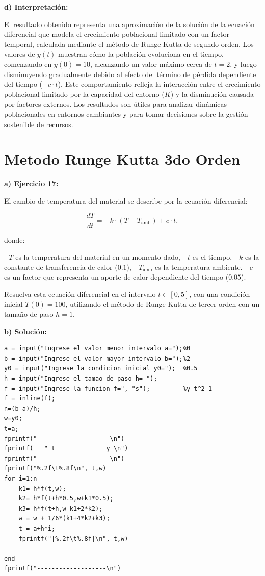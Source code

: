 \documentclass[12pt,a4paper,twoside]{article}  %
\begin{document}
\textbf{d) Interpretación:}

El resultado obtenido representa una aproximación de la solución de la ecuación diferencial que modela el crecimiento poblacional limitado con un factor temporal, calculada mediante el método de Runge-Kutta de segundo orden. Los valores de \( y(t) \) muestran cómo la población evoluciona en el tiempo, comenzando en \( y(0) = 10 \), alcanzando un valor máximo cerca de \( t = 2 \), y luego disminuyendo gradualmente debido al efecto del término de pérdida dependiente del tiempo (\(-c \cdot t\)). Este comportamiento refleja la interacción entre el crecimiento poblacional limitado por la capacidad del entorno (\( K \)) y la disminución causada por factores externos. Los resultados son útiles para analizar dinámicas poblacionales en entornos cambiantes y para tomar decisiones sobre la gestión sostenible de recursos.

\section{Metodo Runge Kutta 3do Orden}


\textbf{a) Ejercicio 17: }

El cambio de temperatura del material se describe por la ecuación diferencial:

\[
\frac{dT}{dt} = -k \cdot (T - T_{\text{amb}}) + c \cdot t,
\]

donde:

- \( T \) es la temperatura del material en un momento dado,
- \( t \) es el tiempo,
- \( k \) es la constante de transferencia de calor (\( 0.1 \)),
- \( T_{\text{amb}} \) es la temperatura ambiente. 
- \( c \) es un factor que representa un aporte de calor dependiente del tiempo (\( 0.05 \)).

Resuelva esta ecuación diferencial en el intervalo \( t \in [0, 5] \), con una condición inicial \( T(0) = 100 \), utilizando el método de Runge-Kutta de tercer orden con un tamaño de paso \( h = 1 \).

\textbf{b) Solución:}

\begin{lstlisting}
a = input("Ingrese el valor menor intervalo a=");%0
b = input("Ingrese el valor mayor intervalo b=");%2
y0 = input("Ingrese la condicion inicial y0=");  %0.5
h = input("Ingrese el tamao de paso h= ");
f = input("Ingrese la funcion f=", "s");         %y-t^2-1
f = inline(f);
n=(b-a)/h;
w=y0;
t=a;
fprintf("--------------------\n")
fprintf(   " t              y \n")
fprintf("--------------------\n")
fprintf("%.2f\t%.8f\n", t,w)
for i=1:n
    k1= h*f(t,w);
    k2= h*f(t+h*0.5,w+k1*0.5);
    k3= h*f(t+h,w-k1+2*k2);
    w = w + 1/6*(k1+4*k2+k3);
    t = a+h*i;
    fprintf("|%.2f\t%.8f|\n", t,w)
    
end
fprintf("-------------------\n")
\end{lstlisting}
\end{document}
